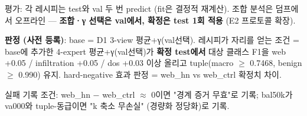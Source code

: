 \par\noindent \textbullet\enspace 평가: 각 레시피는 test와 val 두 번 predict (fit은 결정적 재계산). 조합 분석은 덤프에서 오프라인 — \textbf{조합·γ 선택은 val에서, 확정은 test 1회 적용} (E2 프로토콜 확장).


\par\noindent \textbullet\enspace \textbf{판정 (사전 등록)}: base =\allowbreak{} D1 3-view 평균+\allowbreak{}γ(val선택). 레시피가 자리를 얻는 조건 =\allowbreak{} base에 추가한 4-expert 평균+\allowbreak{}γ(val선택)가 \textbf{확정 test에서} 대상 클래스 F1을 web +\allowbreak{}0.05 /\allowbreak{} infiltration +\allowbreak{}0.05 /\allowbreak{} dos +\allowbreak{}0.03 이상 올리고 tuple(macro \ensuremath{\geq} 0.7468, benign \ensuremath{\geq} 0.990) 유지. hard-negative 효과 판정 =\allowbreak{} web\_\allowbreak{}hn vs web\_\allowbreak{}ctrl 확정치 차이.


\par\noindent \textbullet\enspace 실패 기록 조건: web\_\allowbreak{}hn − web\_\allowbreak{}ctrl \ensuremath{\approx} 0이면 "경계 증거 무효"로 기록; bal50k가 va000와 tuple-동급이면 "k 축소 무손실" (경량화 정당화)로 기록.



